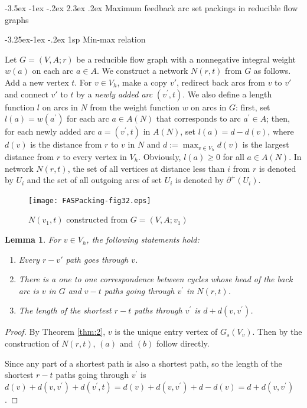 \documentclass[11pt]{article}
\makeatletter
\newtheorem{lemma}[theorem]{Lemma}
\renewcommand\section{%
  \@startsection{section}{1}
                {\z@}%
                {-3.5ex \@plus -1ex \@minus -.2ex}%
                {2.3ex \@plus.2ex}%
                {\large\bfseries}%
}
\renewcommand\subsection{%
  \@startsection{subsection}{2}
                {\z@}%
                {-3.25ex\@plus -1ex \@minus -.2ex}%
                {1sp}%
                {\normalsize\bfseries}%
}
\makeatother
\begin{document}
\section{Maximum feedback arc set packings in reducible flow graphs}
\label{sec:3}

\subsection{Min-max relation}
\label{sec:4}

Let $G=(V,A;r)$ be a reducible flow graph with a nonnegative integral weight $w(a)$ on each arc $a\in A$. We construct a network $N(r,t)$ from $G$ as follows. Add a new vertex $t$. For $v\in V_h$, make a copy $v'$, redirect back arcs from $v$ to $v'$ and connect $v'$ to $t$ by a \emph{newly added arc} $(v^\prime,t)$. 
We also define a length function $l$ on arcs in $N$ from the weight function $w$ on arcs in $G$: first, set $l(a)=w(a^\prime)$ for each arc $a\in A(N)$ that corresponds to arc $a^\prime\in A$; then, for each newly added arc $a=(v^\prime,t)$ in $A(N)$, set $l(a)=d-d(v)$, where $d(v)$ is the distance from $r$ to $v$ in $N$ and $d:=\max_{v\in V_h} d(v)$ is the largest distance from $r$ to every vertex in $V_h$. Obviously, $l(a)\geq 0$ for all $a\in A(N)$. In network $N(r,t)$, the set of all vertices at distance less than $i$ from $r$ is denoted by $U_i$ and the set of all outgoing arcs of set $U_i$ is denoted by $\partial^+(U_i)$.

\begin{figure}
    \centering
    \texttt{[image: FASPacking-fig32.eps]}
    \caption{$N(v_1,t)$ constructed from $G=(V,A;v_1)$}
     \label{fig:3}
 \end{figure}

\begin{lemma}
\label{lem:2}
For $v\in V_h$, the following statements hold:
\begin{enumerate}[label=\emph{(}\alph*\emph{)}]
  \item Every $r-v'$ path goes through $v$.
  \item There is a one to one correspondence between cycles whose head of the back arc is $v$ in $G$ and $v-t$ paths going through $v^\prime$ in $N(r,t)$. 
  \item The length of the shortest $r-t$ paths through $v^\prime$ is $d+d(v,v^\prime)$.
\end{enumerate}
\end{lemma}
\begin{proof}
By Theorem \ref{thm:2}, $v$ is the unique entry vertex of $G_s(V_v)$. Then by the construction of $N(r,t)$, $(a)$ and $(b)$ follow directly.

Since any part of a shortest path is also a shortest path, so the length of the shortest $r-t$ paths going through $v^\prime$ is $d(v)+d(v,v^\prime)+d(v^\prime,t)=d(v)+d(v,v^\prime)+d-d(v)=d+d(v,v^\prime)$.
\end{proof}
\end{document}
